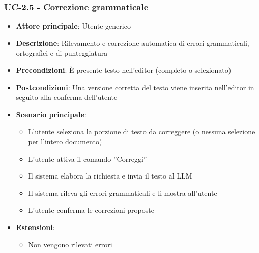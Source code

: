 \documentclass[11pt,a4paper]{article}
\begin{document}
\subsubsection{UC-2.5 - Correzione grammaticale}
\begin{itemize}
    \item \textbf{Attore principale}: Utente generico
    \item \textbf{Descrizione}: Rilevamento e correzione automatica di errori grammaticali, ortografici e di punteggiatura
    \item \textbf{Precondizioni}: È presente testo nell’editor (completo o selezionato)
    \item \textbf{Postcondizioni}: Una versione corretta del testo viene inserita nell’editor in seguito alla conferma dell'utente
    \item \textbf{Scenario principale}:
    \begin{itemize}
        \item L’utente seleziona la porzione di testo da correggere (o nessuna selezione per l'intero documento)
        \item L’utente attiva il comando ”Correggi”
        \item Il sistema elabora la richiesta e invia il testo al LLM
        \item Il sistema rileva gli errori grammaticali e li mostra all'utente
        \item L'utente conferma le correzioni proposte
    \end{itemize}
    \item \textbf{Estensioni}:
    \begin{itemize}
        \item Non vengono rilevati errori
    \end{itemize}
\end{itemize}
\end{document}
